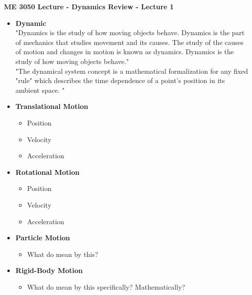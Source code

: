 \documentclass[11pt]{article}
\newcommand{\NUM}{1 }
\newcommand{\B}{\color{blue}}
\newcommand{\K}{\color{black}}
\begin{document}
\textbf{ \LARGE ME 3050 Lecture - Dynamics Review - Lecture \NUM  } \\

\begin{itemize}


	\item \textbf{ \LARGE \B Dynamic\K} \\
			
			\Large{"Dynamics is the study of how moving objects behave. Dynamics is the part of mechanics that studies movement and its causes. The study of the causes of motion and changes in motion is known as dynamics. Dynamics is the study of how moving objects behave."} \vspace{5mm} \\

			\Large{"The dynamical system concept is a mathematical formalization for any fixed "rule" which describes the time dependence of a point's position in its ambient space. "} \vspace{5mm} \\

	\item \textbf{ \Large Translational Motion } 
\begin{itemize}
\item Position
\item Velocity 
\item Acceleration \vspace{2mm}\\
\end{itemize} 

	\item \textbf{ \Large Rotational Motion }
\begin{itemize}
\item Position
\item Velocity 
\item Acceleration \vspace{2mm}\\
\end{itemize} 		
	
	\item \textbf{ \Large Particle Motion } 
\begin{itemize}
\item What do mean by this? \vspace{2mm}\\
\end{itemize}
\item \textbf{ \Large Rigid-Body Motion } 
\begin{itemize}
\item What do mean by this specifically? Mathematically?
\end{itemize}


\end{itemize}
\end{document}
